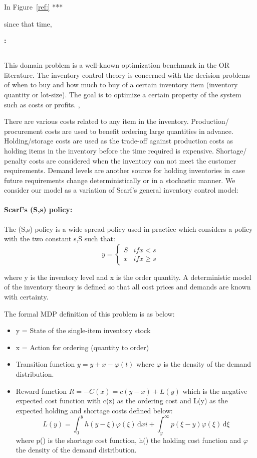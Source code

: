 In Figure~\ref{ref:} ***


since
that time, 

{\bf \WaterReservoir:}

\subsection{\InventoryControl}
This domain problem is a well-known optimization benchmark in the OR
literature. The inventory control theory is concerned with the decision problems of when to buy and how much to buy of a certain inventory item (inventory quantity or lot-size). The goal is to optimize a certain property of the system such as costs or profits. \cite{Scarf2002}, \cite{Scarf_Karlin58} 

There are various costs related to any item in the inventory. Production/ procurement costs are used to benefit ordering large quantities in advance. Holding/storage costs are used as the trade-off against production costs as holding items in the inventory before the time required is expensive. Shortage/ penalty costs are considered when the inventory can not meet the customer requirements. Demand levels are another source for holding inventories in case future requirements change deterministically or in a stochastic manner. 
We consider our model as a variation of Scarf's general inventory control model:
 
\paragraph*{Scarf's (S,s) policy:}
The (S,s) policy is a wide spread policy used in practice which considers a policy with the two constant s,S such that: 
\[y = \begin{cases}
S & if x<s \\
x & if x \geq s
\end{cases}\]

where y is the inventory level and x is the order quantity.  A deterministic model of the inventory theory is defined so that all cost prices and demands are known with certainty. 

The formal MDP definition of this problem is as below:
\begin{itemize}
\item y = State of the single-item inventory stock
\item x = Action for ordering (quantity to order) 
\item Transition function $y = y + x - \varphi(t) $ where $\varphi$ is the density of the demand distribution.
\item Reward function $R = -C(x) = c(y-x)+L(y)$ which is the negative expected cost function with c(z) as the ordering cost and L(y) as the expected holding and shortage costs defined below: 
\[ 
L(y) =\int_0^y \! h(y-\xi)\varphi(\xi) \, \mathrm{d} xi + \int_y^{\infty} \! p(\xi - y)\varphi(\xi) \, \mathrm{d} \xi 
\]
where p() is the shortage cost function, h() the holding cost function and $\varphi$ the density of the demand distribution. 
\end{itemize}

